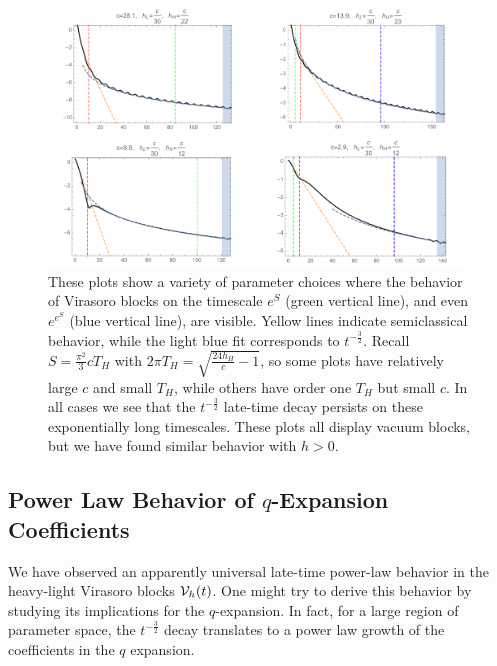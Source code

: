 \begin{figure}[h]
\begin{centering}
\includegraphics[width=0.98\textwidth]{virasoro_chapter/VBlockESEES}
\caption{ These plots show a variety of parameter choices where the behavior of Virasoro blocks on the timescale $e^S$ (green vertical line), and even $e^{e^S}$ (blue vertical line), are visible.  Yellow lines indicate semiclassical behavior, while the light blue fit corresponds to $t^{-\frac{3}{2}}$.  Recall $S = \frac{\pi^2}{3} c T_H$ with $2 \pi T_H =  \sqrt{\frac{24 h_H}{c} - 1}$, so some plots have relatively large $c$ and small $T_H$, while others have order one $T_H$ but small $c$. In all cases we see that the $t^{-\frac{3}{2}}$ late-time decay persists on these exponentially long timescales.  These plots all display vacuum blocks, but we have found similar behavior with $h > 0$.}
\label{fig:VBlockESEES}
\end{centering}
\end{figure}

\subsection{Power Law Behavior of $q$-Expansion Coefficients}
\label{sec:CoeffPowerLaw}

We have observed an apparently universal late-time power-law behavior in the heavy-light Virasoro blocks ${\cal V}_h(t)$.  One might try to derive this behavior by studying its implications for the $q$-expansion.  In fact, for a large region of parameter space, the $t^{-\frac{3}{2}}$ decay  translates to a power law growth of the coefficients in the $q$ expansion. 

